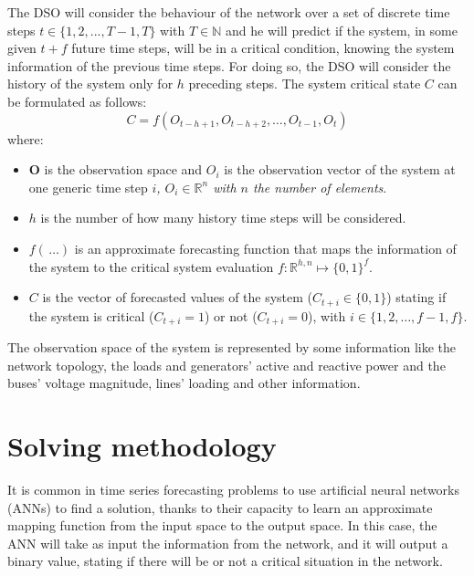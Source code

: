 The \gls{DSO} will consider the behaviour of the network over a set of discrete time steps $t \in \{1,2,...,T-1,T\}$ with $T \in \mathbb{N}$ and he will predict if the system, in some given $t+f$ future time steps, will be in a critical condition, knowing the system information of the previous time steps. For doing so, the \gls{DSO} will consider the history of the system only for $h$ preceding steps. The system critical state $C$ can be formulated as follows: 
\begin{equation} \label{eq:fmapping}
    C = f(O_{t-h+1},O_{t-h+2},\dots,O_{t-1},O_{t})
\end{equation}
\noindent where:
\begin{itemize}
    \item $\textbf{O}$ is the observation space and $O_i$ is the observation vector of the system at one generic time step $i$\emph{, $O_i \in \mathbb{R}^n$ with $n$ the number of elements}.
    \item $h$ is the number of how many history time steps will be considered.
    \item $f(\,\dots)$ is an approximate forecasting function that maps the information of the system to the critical system evaluation $f: \mathbb{R}^{h,n} \mapsto \{0,1\}^f$.
    \item $C$ is the vector of forecasted values of the system ($C_{t+i} \in \{0,1\}$) stating if the system is critical ($C_{t+i}=1$) or not ($C_{t+i}=0$), with $i \in \{1,2,\dots,f-1,f\}$. 
\end{itemize}

The observation space of the system is represented by some information like the network topology, the loads and generators' active and reactive power and the buses' voltage magnitude, lines' loading and other information.


\section{Solving methodology}
\label{sec:sm}
It is common in time series forecasting problems to use artificial neural networks (\glspl{ANN}) to find a solution, thanks to their capacity to learn an approximate mapping function from the input space to the output space. In this case, the \gls{ANN} will take as input the information from the network, and it will output a binary value, stating if there will be or not a critical situation in the network. \\

